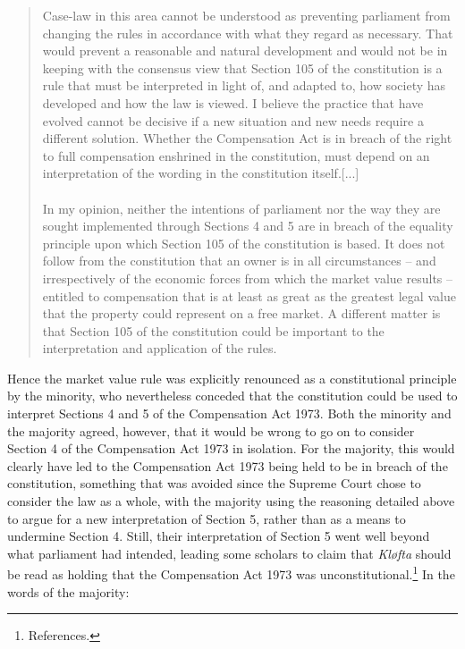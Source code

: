 \documentclass[10pt]{article} %
\begin{document}
\begin{quote}
Case-law in this area cannot be understood as preventing parliament from changing the rules in accordance with what they regard as necessary. That would prevent a reasonable and natural development and would not be in keeping with the consensus view that Section 105 of the constitution is a rule that must be interpreted in light of, and adapted to, how society has developed and how the law is viewed. I believe the practice that have evolved cannot be decisive if a new situation and new needs require a different solution. Whether the Compensation Act is in breach of the right to full compensation enshrined in the constitution, must depend on an interpretation of the wording in the constitution itself.[...] \\ \\
In my opinion, neither the intentions of parliament nor the way they are sought implemented through Sections 4 and 5 are in breach of the equality principle upon which Section 105 of the constitution is based. It does not follow from the constitution that an owner is in all circumstances -- and irrespectively of the economic forces from which the market value results -- entitled to compensation that is at least as great as the greatest legal value that the property could represent on a free market. A different matter is that Section 105 of the constitution could be important to the interpretation and application of the rules.
\end{quote} 

Hence the market value rule was explicitly renounced as a constitutional principle by the minority, who nevertheless conceded that the constitution could be used to interpret Sections 4 and 5 of the Compensation Act 1973. Both the minority and the majority agreed, however, that  it would be wrong to go on to consider Section 4 of the Compensation Act 1973 in isolation. For the majority, this would clearly have led to the Compensation Act 1973 being held to be in breach of the constitution, something that was avoided since the Supreme Court chose to consider the law as a whole, with the majority using the reasoning detailed above to argue for a new interpretation of Section 5, rather than as a means to undermine Section 4. Still, their interpretation of Section 5 went well beyond what parliament had intended, leading some scholars to claim that \emph{Kløfta} should be read as holding that the Compensation Act 1973 was unconstitutional.\footnote{References.} In the words of the majority:
\end{document}

